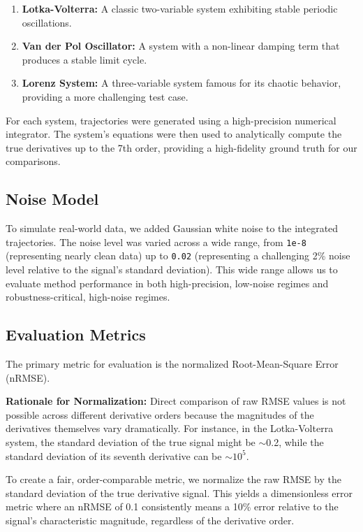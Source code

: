 \begin{enumerate}
    \item \textbf{Lotka-Volterra:} A classic two-variable system exhibiting stable periodic oscillations.
    \item \textbf{Van der Pol Oscillator:} A system with a non-linear damping term that produces a stable limit cycle.
    \item \textbf{Lorenz System:} A three-variable system famous for its chaotic behavior, providing a more challenging test case.
\end{enumerate}

For each system, trajectories were generated using a high-precision numerical integrator. The system's equations were then used to analytically compute the true derivatives up to the 7th order, providing a high-fidelity ground truth for our comparisons.

\subsection{Noise Model}
\label{sec:noise_model}

To simulate real-world data, we added Gaussian white noise to the integrated trajectories. The noise level was varied across a wide range, from \texttt{1e-8} (representing nearly clean data) up to \texttt{0.02} (representing a challenging 2\% noise level relative to the signal's standard deviation). This wide range allows us to evaluate method performance in both high-precision, low-noise regimes and robustness-critical, high-noise regimes.

\subsection{Evaluation Metrics}
\label{sec:metrics}

The primary metric for evaluation is the normalized Root-Mean-Square Error (nRMSE).

\textbf{Rationale for Normalization:} Direct comparison of raw RMSE values is not possible across different derivative orders because the magnitudes of the derivatives themselves vary dramatically. For instance, in the Lotka-Volterra system, the standard deviation of the true signal might be $\sim$0.2, while the standard deviation of its seventh derivative can be $\sim 10^5$.

To create a fair, order-comparable metric, we normalize the raw RMSE by the standard deviation of the true derivative signal. This yields a dimensionless error metric where an nRMSE of 0.1 consistently means a 10\% error relative to the signal's characteristic magnitude, regardless of the derivative order.

